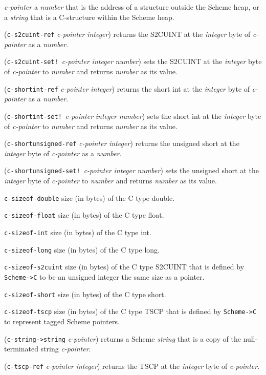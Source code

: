 \documentclass[10pt,twocolumn]{article}
\begin{document}
\emph{c-pointer} a \emph{number} that is the address of a structure
outside the Scheme heap, or a \emph{string} that is a C-structure within
the Scheme heap.

(\texttt{c-s2cuint-ref} \emph{c-pointer} \emph{integer}) returns the
S2CUINT at the \emph{integer} byte of \emph{c-pointer} as a
\emph{number}.

(\texttt{c-s2cuint-set!}\ \emph{c-pointer} \emph{integer} \emph{number}) sets the
S2CUINT at the \emph{integer} byte of \emph{c-pointer} to \emph{number} and
returns \emph{number} as its value.

(\texttt{c-shortint-ref} \emph{c-pointer} \emph{integer}) returns the short int
at the \emph{integer} byte of \emph{c-pointer} as a \emph{number}.

(\texttt{c-shortint-set!}\ \emph{c-pointer} \emph{integer} \emph{number}) sets the
short int at the \emph{integer} byte of \emph{c-pointer} to \emph{number} and
returns \emph{number} as its value.

(\texttt{c-shortunsigned-ref} \emph{c-pointer} \emph{integer}) returns the
unsigned short at the \emph{integer} byte of \emph{c-pointer} as a
\emph{number}.

(\texttt{c-shortunsigned-set!}\ \emph{c-pointer} \emph{integer} \emph{number}) sets
the unsigned short at the \emph{integer} byte of \emph{c-pointer} to
\emph{number} and returns \emph{number} as its value.

\texttt{c-sizeof-double} size (in bytes) of the C type double.

\texttt{c-sizeof-float} size (in bytes) of the C type float.

\texttt{c-sizeof-int} size (in bytes) of the C type int.

\texttt{c-sizeof-long} size (in bytes) of the C type long.

\texttt{c-sizeof-s2cuint} size (in bytes) of the C type S2CUINT
that is defined by \texttt{Scheme->C} to be an unsigned integer the
same size as a pointer.

\texttt{c-sizeof-short} size (in bytes) of the C type short.

\texttt{c-sizeof-tscp} size (in bytes) of the C type TSCP that is
defined by \texttt{Scheme->C} to represent tagged Scheme pointers.

(\texttt{c-string->string} \emph{c-pointer}) returns a Scheme \emph{string} that
is a copy of the null-terminated string \emph{c-pointer}.

(\texttt{c-tscp-ref} \emph{c-pointer} \emph{integer}) returns the
TSCP at the \emph{integer} byte of \emph{c-pointer}.
\end{document}
